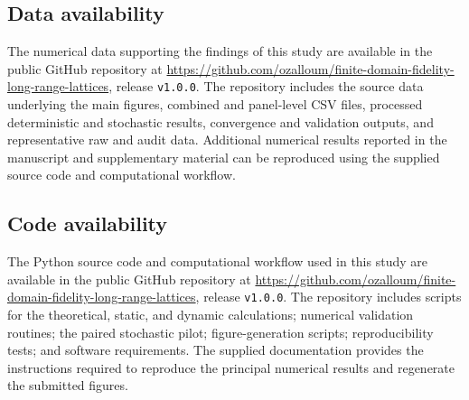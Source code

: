 \subsection*{Data availability}
The numerical data supporting the findings of this study are available in the public GitHub repository at \url{https://github.com/ozalloum/finite-domain-fidelity-long-range-lattices}, release \texttt{v1.0.0}. The repository includes the source data underlying the main figures, combined and panel-level CSV files, processed deterministic and stochastic results, convergence and validation outputs, and representative raw and audit data. Additional numerical results reported in the manuscript and supplementary material can be reproduced using the supplied source code and computational workflow.

\subsection*{Code availability}
The Python source code and computational workflow used in this study are available in the public GitHub repository at \url{https://github.com/ozalloum/finite-domain-fidelity-long-range-lattices}, release \texttt{v1.0.0}. The repository includes scripts for the theoretical, static, and dynamic calculations; numerical validation routines; the paired stochastic pilot; figure-generation scripts; reproducibility tests; and software requirements. The supplied documentation provides the instructions required to reproduce the principal numerical results and regenerate the submitted figures.
